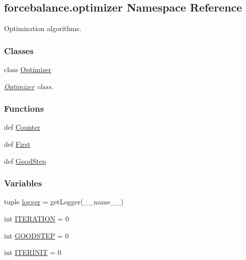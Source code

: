 \hypertarget{namespaceforcebalance_1_1optimizer}{\subsection{forcebalance.\-optimizer Namespace Reference}
\label{namespaceforcebalance_1_1optimizer}
}


Optimization algorithms.  


\subsubsection*{Classes}
\begin{DoxyCompactItemize}
\item 
class \hyperlink{classforcebalance_1_1optimizer_1_1Optimizer}{Optimizer}
\begin{DoxyCompactList}\small\item\em \hyperlink{classforcebalance_1_1optimizer_1_1Optimizer}{Optimizer} class. \end{DoxyCompactList}\end{DoxyCompactItemize}
\subsubsection*{Functions}
\begin{DoxyCompactItemize}
\item 
def \hyperlink{namespaceforcebalance_1_1optimizer_ae1f6c649703a22b2f767a5f6bf53297b}{Counter}
\item 
def \hyperlink{namespaceforcebalance_1_1optimizer_a1b6394e430a899f19957694a173e9150}{First}
\item 
def \hyperlink{namespaceforcebalance_1_1optimizer_ab43948ecf30c90d319e0c0b107fe484a}{Good\-Step}
\end{DoxyCompactItemize}
\subsubsection*{Variables}
\begin{DoxyCompactItemize}
\item 
tuple \hyperlink{namespaceforcebalance_1_1optimizer_a8c7d22696df2debf02ce9e3bb35349fd}{logger} = get\-Logger(\-\_\-\-\_\-name\-\_\-\-\_\-)
\item 
int \hyperlink{namespaceforcebalance_1_1optimizer_aaf93ec60981b2c73b2f36a4cf5c5874f}{I\-T\-E\-R\-A\-T\-I\-O\-N} = 0
\item 
int \hyperlink{namespaceforcebalance_1_1optimizer_a7b0cf561a0ec911ee4b217cb0b05a28e}{G\-O\-O\-D\-S\-T\-E\-P} = 0
\item 
int \hyperlink{namespaceforcebalance_1_1optimizer_a42aec8ce55b20c7ffdd69bf188ebbf44}{I\-T\-E\-R\-I\-N\-I\-T} = 0
\end{DoxyCompactItemize}



